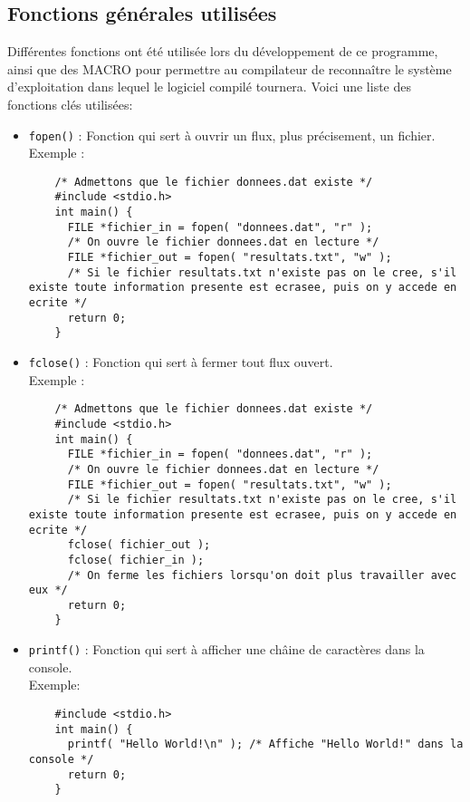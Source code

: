 \documentclass[11pt]{article}
\begin{document}
\subsection{Fonctions générales utilisées}
Différentes fonctions ont été utilisée lors du développement de ce programme, ainsi que des MACRO pour
permettre au compilateur de reconnaître le système d'exploitation dans lequel le logiciel compilé tournera.
Voici une liste des fonctions clés utilisées:
\begin{itemize}
  
\item \texttt{fopen()} : Fonction qui sert à ouvrir un flux, plus précisement, un fichier.\\
  Exemple :
  \begin{lstlisting}
    /* Admettons que le fichier donnees.dat existe */
    #include <stdio.h>
    int main() {
      FILE *fichier_in = fopen( "donnees.dat", "r" );
      /* On ouvre le fichier donnees.dat en lecture */
      FILE *fichier_out = fopen( "resultats.txt", "w" );
      /* Si le fichier resultats.txt n'existe pas on le cree, s'il existe toute information presente est ecrasee, puis on y accede en ecrite */
      return 0;
    }
  \end{lstlisting}

\item \texttt{fclose()} : Fonction qui sert à fermer tout flux ouvert.\\
  Exemple :
  \begin{lstlisting}
    /* Admettons que le fichier donnees.dat existe */
    #include <stdio.h>
    int main() {
      FILE *fichier_in = fopen( "donnees.dat", "r" );
      /* On ouvre le fichier donnees.dat en lecture */
      FILE *fichier_out = fopen( "resultats.txt", "w" );
      /* Si le fichier resultats.txt n'existe pas on le cree, s'il existe toute information presente est ecrasee, puis on y accede en ecrite */
      fclose( fichier_out );
      fclose( fichier_in );
      /* On ferme les fichiers lorsqu'on doit plus travailler avec eux */
      return 0;
    }
  \end{lstlisting}

  
\item \texttt{printf()} : Fonction qui sert à afficher une châine de caractères dans la console.\\
  Exemple:
  \begin{lstlisting}
    #include <stdio.h>
    int main() {
      printf( "Hello World!\n" ); /* Affiche "Hello World!" dans la console */
      return 0;
    }
  \end{lstlisting}
  

\end{itemize}
\end{document}
